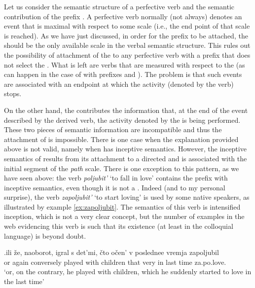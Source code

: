 Let us consider the semantic structure of a perfective verb and the semantic contribution of the  prefix . A perfective verb normally (not always) denotes an event that is maximal with respect to some scale (i.e., the end point of that scale is reached). As we have just discussed, in order for the  prefix  to be attached, the  should be the only available scale in the verbal semantic structure. This rules out the possibility of attachment of the   to any perfective verb with a prefix that does not select the . What is left are verbs that are measured with respect to the  (as can happen in the case of  with prefixes  and ). The problem is that such events are associated with an endpoint at which the activity (denoted by the  verb) stops. 

On the other hand, the   contributes the information that, at the end of the event described by the derived verb, the activity denoted by the  is being performed. These two pieces of semantic information are incompatible and thus the attachment of  is impossible. There is one case when the explanation provided above is not valid, namely when  has inceptive semantics. However, the inceptive semantics of  results from its attachment to a directed  and is associated with the initial segment of the \textit{path} scale. There is one exception to this pattern, as we have seen above: the verb \textit{poljubit'} `to fall in love' contains the prefix  with inceptive semantics, even though it is not a . Indeed (and to my personal surprise), the verb \textit{zapoljubit'} `to start loving' is used by some native speakers, as illustrated by example \ref{ex:zapoljubit}. The semantics of this verb is intensified inception, which is not a very clear concept, but the number of examples in the web evidencing this verb is such that its existence (at least in the colloquial language) is beyond doubt.\largerpage

\exg.\label{ex:zapoljubit}ili \v{z}e, naoborot, igral s det'mi, \v{c}to o\v{c}en' v poslednee vremja zapoljubil\\
or again conversely played with children that very in last time za.po.love.\\
\trans `or, on the contrary, he played with children, which he suddenly started to love in the last time'

